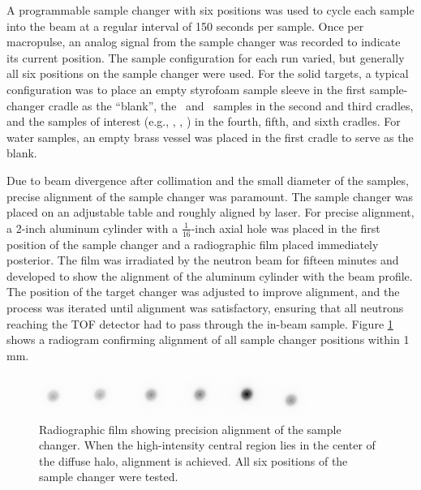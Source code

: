 A programmable sample changer with six positions
was used to cycle each sample into the beam at a regular interval of 150 seconds 
per sample. Once per macropulse, an analog signal from the sample changer was recorded to 
indicate its current position. The sample configuration for each run varied, but
generally all six positions on the sample changer were used. For the solid targets,
a typical configuration was to place an empty styrofoam sample sleeve in the
first sample-changer cradle as
the ``blank'', the \cNat\ and \pbNat\ samples in the second and third
cradles, and the samples of interest (e.g., \niEight, \niNat, \niFour) in
the fourth, fifth, and sixth cradles. For water samples, an empty brass vessel
was placed in the first cradle to serve as the blank.

Due to beam divergence after collimation and the small diameter of the
samples, precise alignment of the sample changer was paramount. The sample
changer was placed on an adjustable table and roughly aligned by laser. For
precise alignment, a 2-inch aluminum cylinder with a
$\frac{1}{16}$-inch axial hole was placed
in the first position of the sample changer and a radiographic film placed
immediately posterior. The film was irradiated by the neutron beam for fifteen 
minutes and developed to show the alignment of the aluminum cylinder with the
beam profile. The position of the target changer was adjusted to improve alignment,
and the process was
iterated until alignment was satisfactory, ensuring that all neutrons
reaching the TOF detector had to pass through the in-beam sample.
Figure \ref{SampleChangerAlignment} shows a radiogram confirming alignment of all
sample changer positions within 1 mm.

\begin{figure}[tb]
    \centering
    \includegraphics[width=0.8\textwidth]{figures/TargetChangerAlignment.png}
    \caption[Radiographic film showing precision alignment of the sample changer]
    {
        Radiographic film showing precision alignment of the sample changer. When the high-intensity
        central region lies in the center of the diffuse halo, alignment is achieved. All six
        positions of the sample changer were tested.
    }
    \label{SampleChangerAlignment}
\end{figure}

